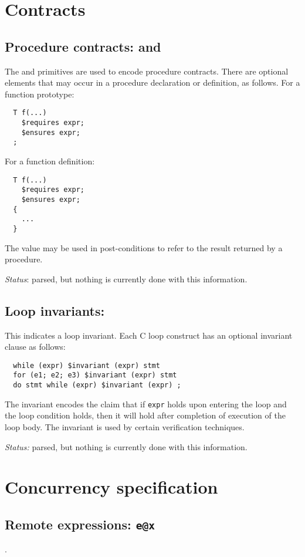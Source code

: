 \section{Contracts}

\subsection{Procedure contracts: \crequires{} and \censures{}}
The \crequires{} and \censures{} primitives are used to encode
procedure contracts.  There are optional
elements that may occur in a procedure declaration or definition,
as follows.  For a function prototype:
\begin{verbatim}
  T f(...)
    $requires expr;
    $ensures expr;
  ;
\end{verbatim}
For a function definition:
\begin{verbatim}
  T f(...)
    $requires expr;
    $ensures expr;
  {
    ...
  }
\end{verbatim}
The value \cresult{} may be used in post-conditions to refer
to the result returned by a procedure.

\emph{Status}: parsed, but nothing is currently done with this
information.

\subsection{Loop invariants: \cinvariant}

This indicates a loop invariant.  Each C loop
construct has an optional invariant clause as follows:
\begin{verbatim}
  while (expr) $invariant (expr) stmt
  for (e1; e2; e3) $invariant (expr) stmt
  do stmt while (expr) $invariant (expr) ;
\end{verbatim}
The invariant encodes the claim that if \texttt{expr} holds upon
entering the loop and the loop condition holds, then it will hold
after completion of execution of the loop body.  The invariant is used
by certain verification techniques.

\emph{Status:} parsed, but nothing is currently done with this
information.

\section{Concurrency specification}

\subsection{Remote expressions: \texttt{e@x}}.

